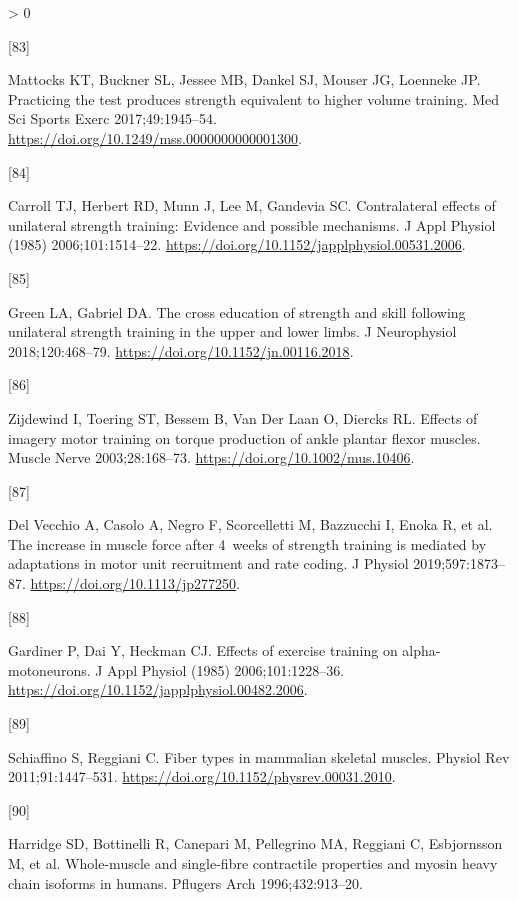 \documentclass[twoside,10pt]{gihclass} %
\newlength{\cslhangindent}
\newlength{\csllabelwidth}
\newenvironment{CSLReferences}[3] %
 {%
  \setlength{\parindent}{0pt}
  \ifodd #1 \everypar{\setlength{\hangindent}{\cslhangindent}}\ignorespaces\fi
  \ifnum #2 > 0
  \setlength{\parskip}{#2\baselineskip}
  \fi
 }%
 {}
\newcommand{\CSLLeftMargin}[1]{\parbox[t]{\maxof{\widthof{#1}}{\csllabelwidth}}{#1}}
\newcommand{\CSLRightInline}[1]{\parbox[t]{\linewidth}{#1}}
\begin{document}
\begin{CSLReferences}{0}{0}
\leavevmode\hypertarget{ref-RN2760}{}%
\CSLLeftMargin{{[}83{]} }
\CSLRightInline{Mattocks KT, Buckner SL, Jessee MB, Dankel SJ, Mouser JG, Loenneke JP. Practicing the test produces strength equivalent to higher volume training. Med Sci Sports Exerc 2017;49:1945--54. \url{https://doi.org/10.1249/mss.0000000000001300}.}

\leavevmode\hypertarget{ref-RN2219}{}%
\CSLLeftMargin{{[}84{]} }
\CSLRightInline{Carroll TJ, Herbert RD, Munn J, Lee M, Gandevia SC. Contralateral effects of unilateral strength training: Evidence and possible mechanisms. J Appl Physiol (1985) 2006;101:1514--22. \url{https://doi.org/10.1152/japplphysiol.00531.2006}.}

\leavevmode\hypertarget{ref-RN2766}{}%
\CSLLeftMargin{{[}85{]} }
\CSLRightInline{Green LA, Gabriel DA. The cross education of strength and skill following unilateral strength training in the upper and lower limbs. J Neurophysiol 2018;120:468--79. \url{https://doi.org/10.1152/jn.00116.2018}.}

\leavevmode\hypertarget{ref-RN2767}{}%
\CSLLeftMargin{{[}86{]} }
\CSLRightInline{Zijdewind I, Toering ST, Bessem B, Van Der Laan O, Diercks RL. Effects of imagery motor training on torque production of ankle plantar flexor muscles. Muscle Nerve 2003;28:168--73. \url{https://doi.org/10.1002/mus.10406}.}

\leavevmode\hypertarget{ref-RN2763}{}%
\CSLLeftMargin{{[}87{]} }
\CSLRightInline{Del Vecchio A, Casolo A, Negro F, Scorcelletti M, Bazzucchi I, Enoka R, et al. The increase in muscle force after 4~weeks of strength training is mediated by adaptations in motor unit recruitment and rate coding. J Physiol 2019;597:1873--87. \url{https://doi.org/10.1113/jp277250}.}

\leavevmode\hypertarget{ref-RN2764}{}%
\CSLLeftMargin{{[}88{]} }
\CSLRightInline{Gardiner P, Dai Y, Heckman CJ. Effects of exercise training on alpha-motoneurons. J Appl Physiol (1985) 2006;101:1228--36. \url{https://doi.org/10.1152/japplphysiol.00482.2006}.}

\leavevmode\hypertarget{ref-RN819}{}%
\CSLLeftMargin{{[}89{]} }
\CSLRightInline{Schiaffino S, Reggiani C. Fiber types in mammalian skeletal muscles. Physiol Rev 2011;91:1447--531. \url{https://doi.org/10.1152/physrev.00031.2010}.}

\leavevmode\hypertarget{ref-RN846}{}%
\CSLLeftMargin{{[}90{]} }
\CSLRightInline{Harridge SD, Bottinelli R, Canepari M, Pellegrino MA, Reggiani C, Esbjornsson M, et al. Whole-muscle and single-fibre contractile properties and myosin heavy chain isoforms in humans. Pflugers Arch 1996;432:913--20.}


\end{CSLReferences}
\end{document}
